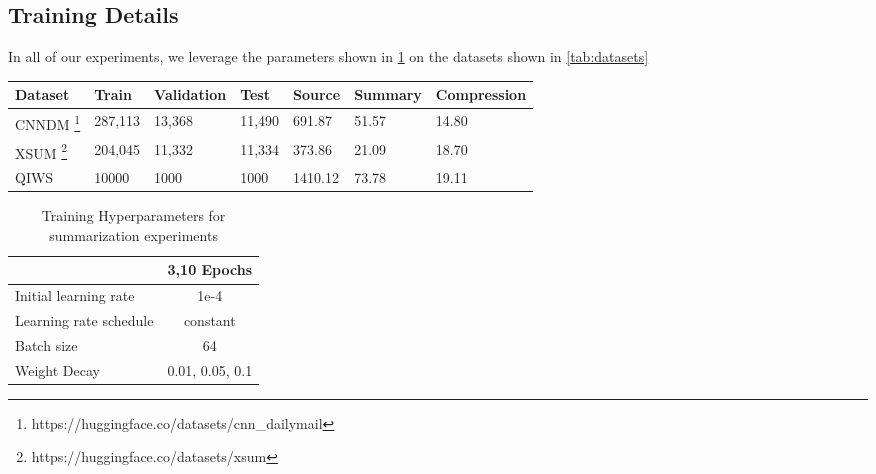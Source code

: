 \subsection{Training Details}
\label{sec:training}
In all of our experiments, we leverage the parameters shown in \ref{tab:hyperparams-transfer} on the datasets shown in \ref{tab:datasets}
\begin{table*}[!htb]
    \centering
    \caption{Statistics for the abstractive summarization datasets which we study. Source and Summary refer to the number of words in each, and the compression factor is the ratio between the two on the train portion of the dataset.}
    \begin{tabular}{|l|l|l|l|l|l|l|}
    \hline
        Dataset  & Train  & Validation & Test & Source & Summary & Compression \\ \hline
        CNNDM \footnote{https://huggingface.co/datasets/cnn\_dailymail} & 287,113 & 13,368 & 11,490 & 691.87 & 51.57 & 14.80 \\ \hline
        XSUM \footnote{https://huggingface.co/datasets/xsum}& 204,045 & 11,332 & 11,334 & 373.86 & 21.09 & 18.70\\ \hline
        QIWS & 10000 & 1000 & 1000 & 1410.12 & 73.78 & 19.11 \\ \hline
    \end{tabular}
    \label{tab:datasets}
\end{table*}
\begin{table}
        {\small 
            \begin{tabular}{l|c}
            \toprule
            & 3,10 Epochs \\
            \midrule
            Initial learning rate & 1e-4\\
            Learning rate schedule &  constant \\
            \midrule
                Batch size & 64 \\
            \midrule
            \midrule
                Weight Decay & 0.01, 0.05, 0.1 \\
            \midrule
            \bottomrule
            \end{tabular}
        }
    \caption{Training Hyperparameters for summarization experiments}
    \label{tab:hyperparams-transfer}
\end{table}
